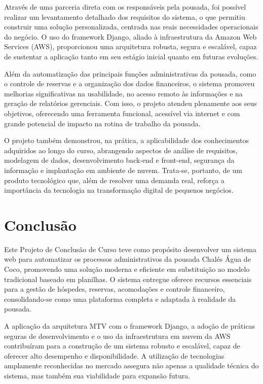\documentclass[
	12pt,				%
	openany,			%
	twoside,			%
	a4paper,			%
	english,			%
	french,				%
	spanish,			%
	brazil				%
	]{abntex2}
\begin{document}
Através de uma parceria direta com os responsáveis pela pousada, foi possível realizar um levantamento detalhado dos requisitos do sistema, o que permitiu construir uma solução personalizada, centrada nas reais necessidades operacionais do negócio. O uso do framework Django, aliado à infraestrutura da Amazon Web Services (AWS), proporcionou uma arquitetura robusta, segura e escalável, capaz de sustentar a aplicação tanto em seu estágio inicial quanto em futuras evoluções.

Além da automatização das principais funções administrativas da pousada, como o controle de reservas e a organização dos dados financeiros, o sistema promoveu melhorias significativas na usabilidade, no acesso remoto às informações e na geração de relatórios gerenciais. Com isso, o projeto atendeu plenamente aos seus objetivos, oferecendo uma ferramenta funcional, acessível via internet e com grande potencial de impacto na rotina de trabalho da pousada.

O projeto também demonstrou, na prática, a aplicabilidade dos conhecimentos adquiridos ao longo do curso, abrangendo aspectos de análise de requisitos, modelagem de dados, desenvolvimento back-end e front-end, segurança da informação e implantação em ambiente de nuvem. Trata-se, portanto, de um produto tecnológico que, além de resolver uma demanda real, reforça a importância da tecnologia na transformação digital de pequenos negócios.


%

\chapter{Conclusão}

Este Projeto de Conclusão de Curso teve como propósito desenvolver um sistema web para automatizar os processos administrativos da pousada Chalés Água de Coco, promovendo uma solução moderna e eficiente em substituição ao modelo tradicional baseado em planilhas. O sistema entregue oferece recursos essenciais para a gestão de hóspedes, reservas, acomodações e controle financeiro, consolidando-se como uma plataforma completa e adaptada à realidade da pousada.

A aplicação da arquitetura MTV com o framework Django, a adoção de práticas seguras de desenvolvimento e o uso da infraestrutura em nuvem da AWS contribuíram para a construção de um sistema robusto e escalável, capaz de oferecer alto desempenho e disponibilidade. A utilização de tecnologias amplamente reconhecidas no mercado assegura não apenas a qualidade técnica do sistema, mas também sua viabilidade para expansão futura.
\end{document}
